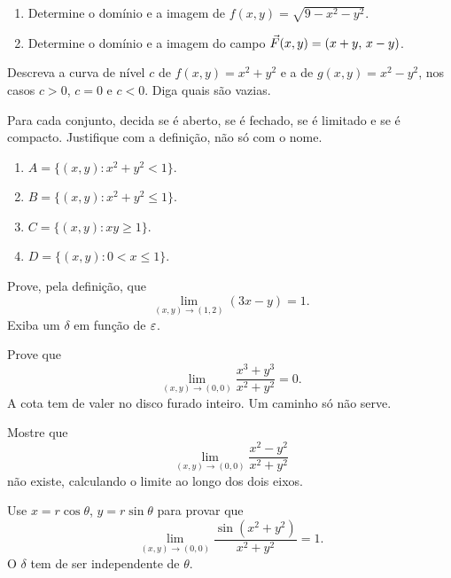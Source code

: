 \documentclass[11pt,a4paper]{article}
\begin{document}
\begin{exercicio}
\begin{enumerate}[label=\alph*)]
\item Determine o domínio e a imagem de $f(x,y)=\sqrt{9-x^2-y^2}$.
\item Determine o domínio e a imagem do campo $\vec{F}(x,y)=(x+y,\,x-y)$.
\end{enumerate}
\end{exercicio}

\begin{exercicio}
Descreva a curva de nível $c$ de $f(x,y)=x^2+y^2$ e a de $g(x,y)=x^2-y^2$, nos casos $c>0$, $c=0$ e $c<0$. Diga quais são vazias.
\end{exercicio}

\begin{exercicio}
Para cada conjunto, decida se é aberto, se é fechado, se é limitado e se é compacto. Justifique com a definição, não só com o nome.
\begin{enumerate}[label=\alph*)]
\item $A=\{(x,y):x^2+y^2<1\}$.
\item $B=\{(x,y):x^2+y^2\le 1\}$.
\item $C=\{(x,y):xy\ge 1\}$.
\item $D=\{(x,y):0<x\le 1\}$.
\end{enumerate}
\end{exercicio}

\begin{exercicio}
Prove, pela definição, que
\[
\lim_{(x,y)\to(1,2)}(3x-y)=1.
\]
Exiba um $\delta$ em função de $\varepsilon$.
\end{exercicio}

\begin{exercicio}
Prove que
\[
\lim_{(x,y)\to(0,0)}\frac{x^3+y^3}{x^2+y^2}=0.
\]
A cota tem de valer no disco furado inteiro. Um caminho só não serve.
\end{exercicio}

\begin{exercicio}
Mostre que
\[
\lim_{(x,y)\to(0,0)}\frac{x^2-y^2}{x^2+y^2}
\]
não existe, calculando o limite ao longo dos dois eixos.
\end{exercicio}

\begin{exercicio}
Use $x=r\cos\theta$, $y=r\sin\theta$ para provar que
\[
\lim_{(x,y)\to(0,0)}\frac{\sin(x^2+y^2)}{x^2+y^2}=1.
\]
O $\delta$ tem de ser independente de $\theta$.
\end{exercicio}
\end{document}
